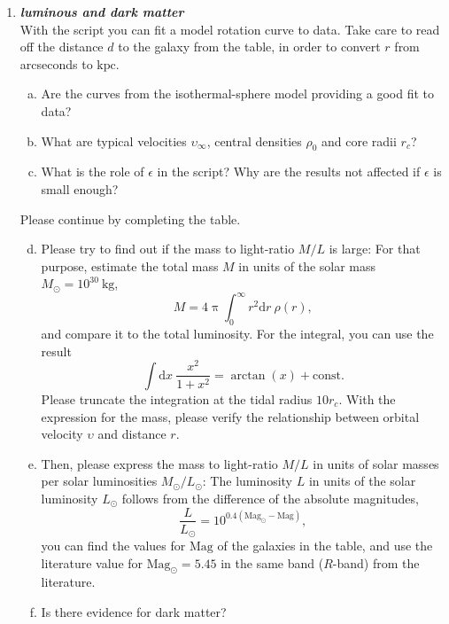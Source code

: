 \documentclass[a4paper,12pt]{article}
\newcommand{\question}[1]{\textbf{\textit{#1}}}
\newcommand{\dd}{\mathrm{d}}
\renewcommand{\pi}{\uppi}
\begin{document}
\begin{enumerate}
\item \question{luminous and dark matter}\\
With the script  you can fit a model rotation curve to data. Take care to read off the distance $d$ to the galaxy from the table, in order to convert $r$ from arcseconds to $\mathrm{kpc}$.
\begin{enumerate}[(a)]
\item{Are the curves from the isothermal-sphere model providing a good fit to data?}
\item{What are typical velocities $\upsilon_\infty$, central densities $\rho_0$ and core radii $r_c$?}
\item{What is the role of $\epsilon$ in the script? Why are the results not affected if $\epsilon$ is small enough?}
\end{enumerate}
Please continue by completing the table.
\begin{enumerate}[(a)]
\setcounter{enumii}{3}
\item{Please try to find out if the mass to light-ratio $M/L$ is large: For that purpose, estimate the total mass $M$ in units of the solar mass $M_\odot = 10^{30}~\mathrm{kg}$,
\begin{equation}
M = 4\pi\int_0^\infty r^2\mathrm{d}r\: \rho(r),
\end{equation}
and compare it to the total luminosity. For the integral, you can use the result
\begin{equation}
\int\dd x\:\frac{x^2}{1+x^2} = \arctan(x) + \mathrm{const}.
\end{equation}
Please truncate the integration at the tidal radius $10r_c$. With the expression for the mass, please verify the relationship between orbital velocity $\upsilon$ and distance $r$.
}
\item{Then, please express the mass to light-ratio $M/L$ in units of solar masses per solar luminosities $M_\odot/L_\odot$: The luminosity $L$ in units of the solar luminosity $L_\odot$ follows from the difference of the absolute magnitudes,
\begin{equation}
\frac{L}{L_\odot} = 10^{0.4(\mathrm{Mag}_\odot - \mathrm{Mag})},
\end{equation}
you can find the values for $\mathrm{Mag}$ of the galaxies in the table, and use the literature value for $\mathrm{Mag}_\odot=5.45$ in the same band ($R$-band) from the literature.
}
\item{Is there evidence for dark matter?}
\end{enumerate}


\end{enumerate}
\end{document}
